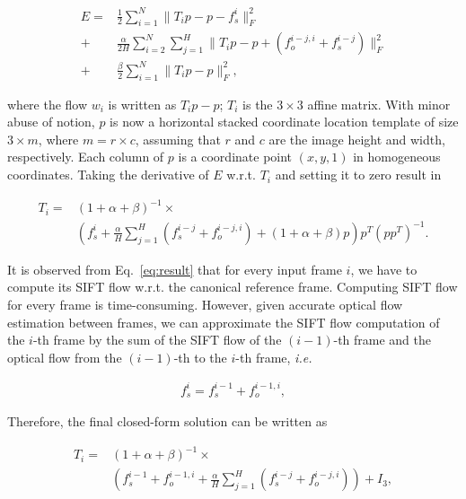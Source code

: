 \documentclass[10pt,journal]{IEEEtran}
\begin{document}
\begin{align}
	\label{data_affine}
E		=&\frac{1}{2}\sum_{i=1}^{N}\parallel{T_ip-p-f_s^i}\parallel_F^2
\\\label{smooth_affine}
				+&\frac{\alpha}{2H}\sum_{i=2}^{N}\sum_{j=1}^{H}\parallel{T_ip-p+(f_o^{i-j,i}+f_s^{i-j})}\parallel_F^2
\\\label{penalty_affine}
				+&\frac{\beta}{2}\sum_{i=1}^{N}\parallel{T_ip-p}\parallel_F^2,
\end{align} 

\noindent where the flow $w_i$ is written as $T_ip-p$; $T_i$ is the $3\times3$ affine matrix. With minor
 abuse of notion, $p$ is now a horizontal stacked coordinate location template of size $3\times m$, where $m=r\times c$, assuming that $r$ and $c$ are the image height and width, respectively. Each column of $p$ is a coordinate point $(x,y,1)$ in homogeneous coordinates. Taking the derivative of $E$ w.r.t. $T_i$ and setting it to zero result in 

\begin{equation}
\begin{aligned}
\label{eq:result}
T_i=&(1+\alpha+\beta)^{-1}\times \\
		&(f_s^i+\frac{\alpha}{H}\sum_{j=1}^H(f_s^{i-j}+f_o^{i-j,i})+(1+\alpha+\beta)p)p^T(pp^T)^{-1}.
\end{aligned}
\end{equation}

It is observed from Eq.~\eqref{eq:result} that for every input frame $i$, we have to compute its SIFT flow w.r.t. the canonical reference frame. Computing SIFT flow for every frame is time-consuming. However, given accurate optical flow estimation between frames, we can approximate the SIFT flow computation of the $i$-th frame by the sum of the SIFT flow of the $(i-1)$-th frame and the optical flow from the $(i-1)$-th to the $i$-th frame, \textit{i.e.}

\begin{align}
\label{eq:approx}
f_s^i=f_s^{i-1}+f_o^{i-1,i},
\end{align}

Therefore, the final closed-form solution can be written as

\begin{align}
\label{eq:final}
T_i=&(1+\alpha+\beta)^{-1}\times \nonumber \\
		&(f_s^{i-1}+f_o^{i-1,i}+\frac{\alpha}{H}\sum_{j=1}^H(f_s^{i-j}+f_o^{i-j,i})) + I_3, \nonumber \\
\end{align}
\end{document}
